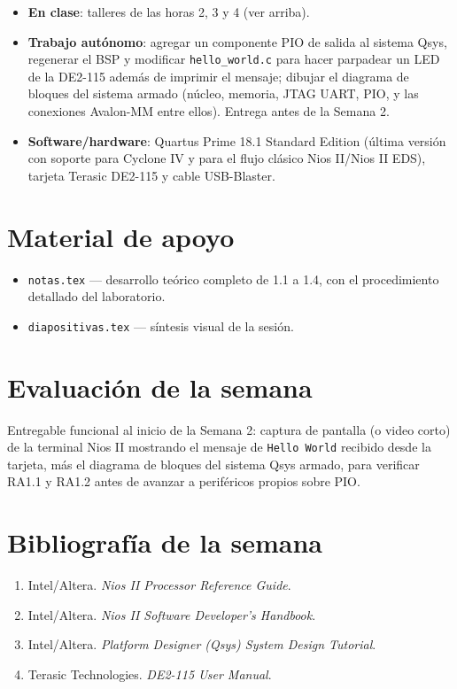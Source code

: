 \documentclass[11pt,letterpaper]{article}
\begin{document}
\begin{itemize}[leftmargin=1.2cm]
  \item \textbf{En clase}: talleres de las horas 2, 3 y 4 (ver arriba).
  \item \textbf{Trabajo autónomo}: agregar un componente PIO de salida al sistema Qsys, regenerar el
        BSP y modificar \texttt{hello\_world.c} para hacer parpadear un LED de la DE2-115 además de
        imprimir el mensaje; dibujar el diagrama de bloques del sistema armado (núcleo, memoria,
        JTAG UART, PIO, y las conexiones Avalon-MM entre ellos). Entrega antes de la Semana 2.
  \item \textbf{Software/hardware}: Quartus Prime 18.1 Standard Edition (última versión con soporte
        para Cyclone IV y para el flujo clásico Nios II/Nios II EDS), tarjeta Terasic DE2-115 y
        cable USB-Blaster.
\end{itemize}

\section{Material de apoyo}

\begin{itemize}[leftmargin=1.2cm]
  \item \texttt{notas.tex} --- desarrollo teórico completo de 1.1 a 1.4, con el procedimiento
        detallado del laboratorio.
  \item \texttt{diapositivas.tex} --- síntesis visual de la sesión.
\end{itemize}

\section{Evaluación de la semana}

Entregable funcional al inicio de la Semana 2: captura de pantalla (o video corto) de la terminal
Nios II mostrando el mensaje de \texttt{Hello World} recibido desde la tarjeta, más el diagrama de
bloques del sistema Qsys armado, para verificar RA1.1 y RA1.2 antes de avanzar a periféricos propios
sobre PIO.

\section{Bibliografía de la semana}

\begin{enumerate}[leftmargin=1.2cm]
  \item Intel/Altera. \emph{Nios II Processor Reference Guide}.
  \item Intel/Altera. \emph{Nios II Software Developer's Handbook}.
  \item Intel/Altera. \emph{Platform Designer (Qsys) System Design Tutorial}.
  \item Terasic Technologies. \emph{DE2-115 User Manual}.
\end{enumerate}
\end{document}
